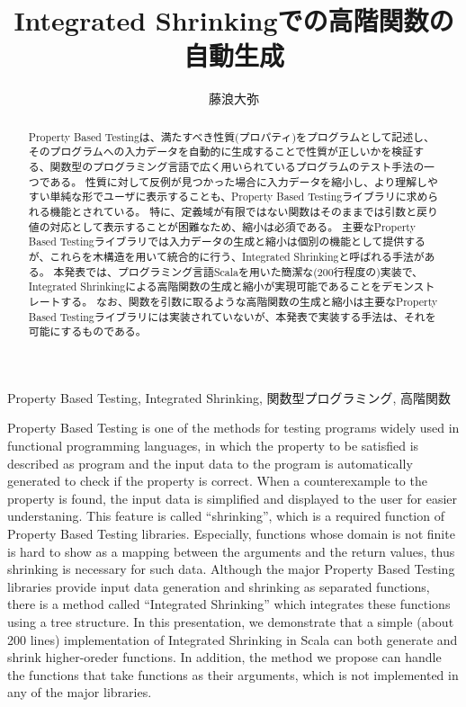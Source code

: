 \documentclass[submit,PRO,onecolumn]{ipsj}
\title{Integrated Shrinkingでの高階関数の自動生成}
\author{藤浪大弥}{FUJINAMI Hiroya}{NihonUCHS}[fnamty.js@gmail.com]
\theoremstyle{definition}
\begin{document}
\begin{abstract}
  Property Based Testingは、満たすべき性質(プロパティ)をプログラムとして記述し、そのプログラムへの入力データを自動的に生成することで性質が正しいかを検証する、関数型のプログラミング言語で広く用いられているプログラムのテスト手法の一つである。
  性質に対して反例が見つかった場合に入力データを縮小し、より理解しやすい単純な形でユーザに表示することも、Property Based Testingライブラリに求められる機能とされている。
  特に、定義域が有限ではない関数はそのままでは引数と戻り値の対応として表示することが困難なため、縮小は必須である。
  主要なProperty Based Testingライブラリでは入力データの生成と縮小は個別の機能として提供するが、これらを木構造を用いて統合的に行う、Integrated Shrinkingと呼ばれる手法がある。
  本発表では、プログラミング言語Scalaを用いた簡潔な(200行程度の)実装で、Integrated Shrinkingによる高階関数の生成と縮小が実現可能であることをデモンストレートする。
  なお、関数を引数に取るような高階関数の生成と縮小は主要なProperty Based Testingライブラリには実装されていないが、本発表で実装する手法は、それを可能にするものである。
\end{abstract}

\begin{jkeyword}
  Property Based Testing, Integrated Shrinking, 関数型プログラミング, 高階関数
\end{jkeyword}


\begin{eabstract}
  Property Based Testing is one of the methods for testing programs widely used in functional programming languages, in which the property to be satisfied is described as program and the input data to the program is automatically generated to check if the property is correct.
  When a counterexample to the property is found, the input data is simplified and displayed to the user for easier understaning. This feature is called ``shrinking'', which is a required function of Property Based Testing libraries.
  Especially, functions whose domain is not finite is hard to show as a mapping between the arguments and the return values, thus shrinking is necessary for such data.
  Although the major Property Based Testing libraries provide input data generation and shrinking as separated functions, there is a method called ``Integrated Shrinking'' which integrates these functions using a tree structure.
  In this presentation, we demonstrate that a simple (about 200 lines) implementation of Integrated Shrinking in Scala can both generate and shrink higher-oreder functions.
  In addition, the method we propose can handle the functions that take functions as their arguments, which is not implemented in any of the major libraries.
\end{eabstract}
\end{document}
